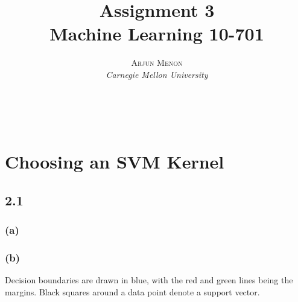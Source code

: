 \documentclass[letterpaper,10pt]{article} %
\title{\textbf{Assignment 3}\\ %
Machine Learning 10-701} %
\author{\textsc{Arjun Menon} %
\\{\textit{Carnegie Mellon University}}} %
\makeatletter
\renewcommand{\maketitle}{ %
\begin{flushright} %
{\LARGE\@title} %

{\large\@author} %
\\\@date %

\end{flushright}
}
\makeatother
\begin{document}
\maketitle %

\section*{Choosing an SVM Kernel}

\subsection*{2.1}

\subsubsection*{(a)}

\subsubsection*{(b)}

Decision boundaries are drawn in blue, with the red and green lines being the margins. Black squares around a data point denote a support vector. 
\end{document}
